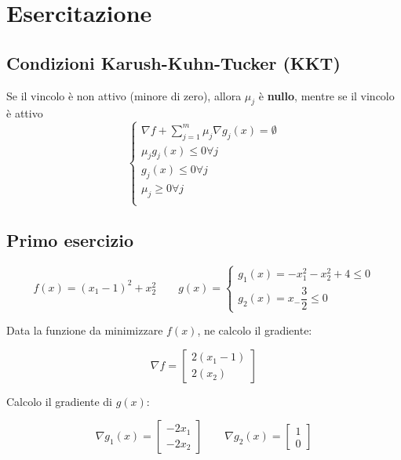 \documentclass[\main/main.tex]{subfiles}
\begin{document}
\section{Esercitazione}

\subsection{Condizioni Karush-Kuhn-Tucker (KKT)}
Se il vincolo è non attivo (minore di zero), allora $\mu_j$ è \textbf{nullo}, mentre se il vincolo è attivo 
\[
	\begin{cases}
	\nabla f + \sum_{j=1}^m \mu_j \nabla g_j (x) = \emptyset \\
	\mu_j g_j(x) \leq 0 \forall j \\
	g_j(x) \leq 0 \forall j \\
	\mu_j \geq 0 \forall j \\
	\end{cases}
\]

\subsection{Primo esercizio}

\begin{center}
\end{center}


\[
	f(x) = (x_1 - 1)^2 + x_2^2
	\qquad
	g(x) = \begin{cases}
		g_1(x) = -x_1 ^2 - x_2^2 + 4 \leq 0  \\
		g_2(x) = x_ - \dfrac{3}{2} \leq 0
	\end{cases}
\]

Data la funzione da minimizzare $f(x)$, ne calcolo il gradiente:

\[
	\nabla f = \begin{bmatrix}
		2(x_1-1)\\
		2(x_2)
	\end{bmatrix}
\]

Calcolo il gradiente di $g(x)$:

\[
	\nabla g_1(x) = \begin{bmatrix}
		-2x_1\\
		-2x_2
	\end{bmatrix}
	\qquad
	\nabla g_2(x) = \begin{bmatrix}
		1\\
		0
	\end{bmatrix}
\]
\end{document}
